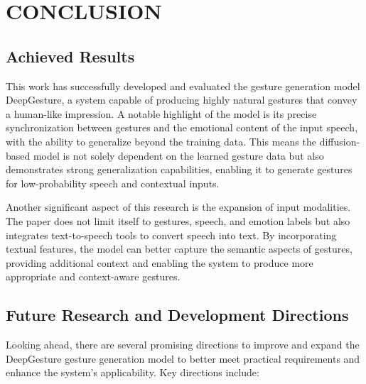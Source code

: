 \section{CONCLUSION}
\label{sec:conclusion}



\subsection{Achieved Results}

This work has successfully developed and evaluated the gesture generation model DeepGesture, a system capable of producing highly natural gestures that convey a human-like impression. A notable highlight of the model is its precise synchronization between gestures and the emotional content of the input speech, with the ability to generalize beyond the training data. This means the diffusion-based model is not solely dependent on the learned gesture data but also demonstrates strong generalization capabilities, enabling it to generate gestures for low-probability speech and contextual inputs.

Another significant aspect of this research is the expansion of input modalities. The paper does not limit itself to gestures, speech, and emotion labels but also integrates text-to-speech tools to convert speech into text. By incorporating textual features, the model can better capture the semantic aspects of gestures, providing additional context and enabling the system to produce more appropriate and context-aware gestures.


\subsection{Future Research and Development Directions}

Looking ahead, there are several promising directions to improve and expand the DeepGesture gesture generation model to better meet practical requirements and enhance the system’s applicability. Key directions include:

